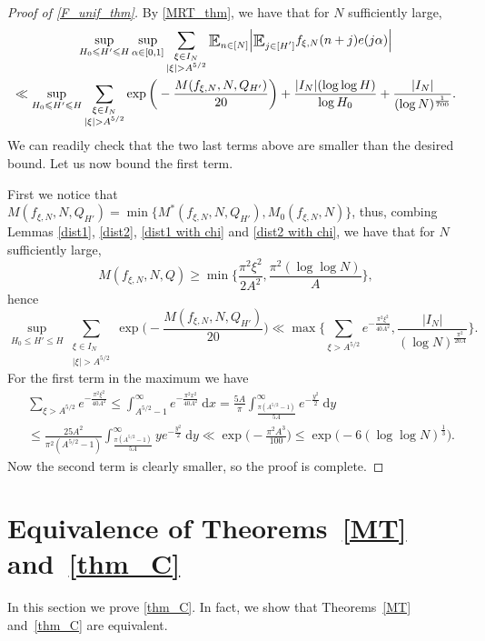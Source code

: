 \documentclass[letter,11pt]{article}
\theoremstyle{plain} %
\theoremstyle{definition} %
\theoremstyle{plain}
\theoremstyle{plain}
\theoremstyle{plain}
\numberwithin{equation}{section}
\renewcommand{\leq}{\leqslant}
\renewcommand{\geq}{\geqslant}
\renewcommand{\d}{~\mathrm{d}}
\newcommand{\Esub}[1]{\raisebox{-0.4ex}{\scalebox{1.4}[1.3]{$\mathbb{E}$}}\raisebox{-0.35ex}{\ensuremath{_{\scriptstyle #1}}}}
\newcommand{\1}{\mathbbm{1}}
\newcommand{\f}{f_{\xi,N}}
\begin{document}
\begin{proof}[Proof of \cref{F_unif_thm}]
By \cref{MRT_thm}, we have that for $N$ sufficiently large,
\begin{multline*}
    \sup_{H_0\leq H'\leq H}\sup_{\alpha\in[0,1]}\sum_{\substack{\xi\in I_N \\ |\xi|>A^{5/2}}} \Esub{n\in[N]}\Big|\Esub{j\in[H']} \f(n+j)e(j\alpha)\Big| \\
    \ll \sup_{H_0\leq H'\leq H}\sum_{\substack{\xi\in I_N \\ |\xi|>A^{5/2}}} \exp\bigg(-\frac{M(\f,N,Q_{H'})}{20}\bigg) + \frac{|I_N|(\log\log{H})}{\log{H_0}} + \frac{|I_N|}{(\log{N})^\frac{1}{700}}.
\end{multline*}
We can readily check that the two last terms above are smaller than the desired bound.
Let us now bound the first term.

First we notice that
$M(\f,N,Q_{H'}) = \min\{M^\ast(\f,N,Q_{H'}),M_0(\f,N)\}$, thus, combing Lemmas
\ref{dist1}, \ref{dist2}, \ref{dist1 with chi} and \ref{dist2 with chi},
we have that for $N$ sufficiently large,
$$M(\f,N,Q) \geq \min\bigg\{\frac{\pi^2\xi^2}{2A^2}, \frac{\pi^2(\log\log{N})}{A}\bigg\},$$
hence
$$\sup_{H_0\leq H'\leq H}\sum_{\substack{\xi\in I_N \\ |\xi|>A^{5/2}}} \exp\bigg(-\frac{M(\f,N,Q_{H'})}{20}\bigg)
\ll \max\Bigg\{\sum_{\xi>A^{5/2}}e^{-\frac{\pi^2\xi^2}{40A^2}},\frac{|I_N|}{(\log{N})^\frac{\pi^2}{20A}}\Bigg\}.$$
For the first term in the maximum we have
\begin{align*}
    & \sum_{\xi>A^{5/2}}e^{-\frac{\pi^2\xi^2}{40A^2}} 
    \leq \int_{A^{5/2}-1}^\infty e^{-\frac{\pi^2 x^2}{40A^2}} \d x 
    = \frac{5A}{\pi} \int_{{\frac{\pi(A^{5/2}-1)}{5A}}}^\infty e^{-\frac{y^2}{2}} \d y \\
    & \leq \frac{25A^2}{\pi^2(A^{5/2}-1)} \int_{{\frac{\pi(A^{5/2}-1)}{5A}}}^\infty ye^{-\frac{y^2}{2}} \d y 
    \ll \exp\bigg(-\frac{\pi^2 A^3}{100}\bigg)
    \leq \exp\big(-6(\log\log{N})^\frac{1}{3}\big).
\end{align*}
Now the second term is clearly smaller, so the proof is complete.
\end{proof}




\section{Equivalence of Theorems~\ref{MT} and~\ref{thm_C}}
\label{Proof_Thm_C}

In this section we prove \cref{thm_C}. In fact, we show that Theorems~\ref{MT} and~\ref{thm_C} are equivalent.
\end{document}
